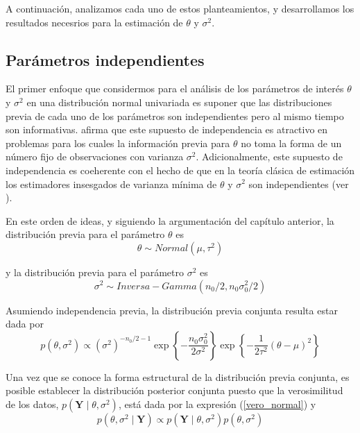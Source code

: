A continuación, analizamos cada uno de estos planteamientos, y desarrollamos los resultados necesrios para la estimación de $\theta$ y $\sigma^2$.

\subsection{Parámetros independientes}

El primer enfoque que considermos para el análisis de los parámetros de interés $\theta$ y $\sigma^2$ en una distribución normal univariada es suponer que las distribuciones previa de cada uno de los parámetros son independientes pero al mismo tiempo son informativas.  afirma que este supuesto de independencia es atractivo en problemas para los cuales la información previa para $\theta$ no toma la forma de un número fijo de observaciones con varianza $\sigma^2$. Adicionalmente, este supuesto de independencia es coeherente con el hecho de que en la teoría clásica de estimación los estimadores insesgados de varianza mínima de $\theta$ y $\sigma^2$ son independientes (ver ).

En este orden de ideas, y siguiendo la argumentación del capítulo anterior, la distribución previa para el parámetro $\theta$ es
\begin{equation*}
\theta \sim Normal(\mu,\tau^2)
\end{equation*}

y la distribución previa para el parámetro $\sigma^2$ es
\begin{equation*}
\sigma^2 \sim Inversa-Gamma(n_0/2,n_0\sigma^2_0/2)
\end{equation*}

Asumiendo independencia previa, la distribución previa conjunta resulta estar dada por
\begin{equation}
p(\theta,\sigma^2)\propto (\sigma^2)^{-n_0/2-1}\exp\left\{-\dfrac{n_0\sigma^2_0}{2\sigma^2}\right\}
\exp\left\{-\frac{1}{2\tau^2}(\theta-\mu)^2\right\}
\end{equation}

Una vez que se conoce la forma estructural de la distribución previa conjunta, es posible establecer la distribución posterior conjunta puesto que la verosimilitud de los datos, $p(\mathbf{Y} \mid \theta,\sigma^2)$, está dada por la expresión (\ref{vero_normal}) y
\begin{equation*}
p(\theta,\sigma^2 \mid \mathbf{Y})\propto p(\mathbf{Y} \mid \theta,\sigma^2)p(\theta,\sigma^2)
\end{equation*}

